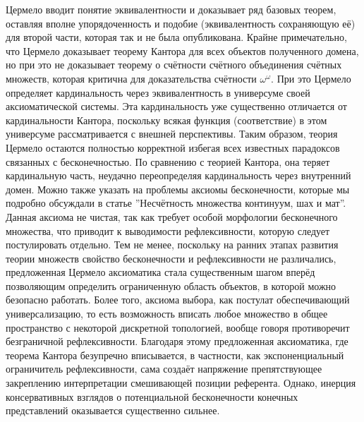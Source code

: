 \documentclass[12pt]{article}
\begin{document}
Цермело вводит понятие эквивалентности и доказывает ряд базовых теорем, оставляя вполне упорядоченность и подобие (эквивалентность сохраняющую её) для второй части, которая так и не была опубликована. Крайне примечательно, что Цермело доказывает теорему Кантора для всех объектов полученного домена, но при это не доказывает теорему о счётности счётного объединения счётных множеств, которая критична для доказательства счётности $\omega^{\omega}$. При это Цермело определяет кардинальность через эквивалентность в универсуме своей аксиоматической системы. Эта кардинальность уже существенно отличается от кардинальности Кантора, поскольку всякая функция (соответствие) в этом универсуме рассматривается с внешней перспективы. Таким образом, теория Цермело остаются полностью корректной избегая всех известных парадоксов связанных с бесконечностью. По сравнению с теорией Кантора, она теряет кардинальную часть, неудачно переопределяя кардинальность через внутренний домен. Можно также указать на проблемы аксиомы бесконечности, которые мы подробно обсуждали в статье ''Несчётность множества континуум, шах и мат''. Данная аксиома не чистая, так как требует особой морфологии бесконечного множества, что приводит к выводимости рефлексивности, которую следует постулировать отдельно. Тем не менее, поскольку на ранних этапах развития теории множеств свойство бесконечности и рефлексивности не различались, предложенная Цермело аксиоматика стала существенным шагом вперёд позволяющим определить ограниченную область объектов, в которой можно безопасно работать. Более того, аксиома выбора, как постулат обеспечивающий универсализацию, то есть возможность вписать любое множество в общее пространство с некоторой дискретной топологией, вообще говоря противоречит безграничной рефлексивности. Благодаря этому предложенная аксиоматика, где теорема Кантора безупречно вписывается, в частности, как экспоненциальный ограничитель рефлексивности, сама создаёт напряжение препятствующее закреплению интерпретации смешивающей позиции референта. Однако, инерция консервативных взглядов о потенциальной бесконечности конечных представлений оказывается существенно сильнее. 
\end{document}
